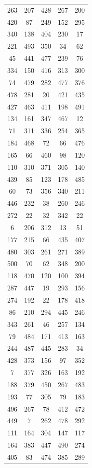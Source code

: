 \documentclass[a4paper,12pt]{article}
\begin{document}
\begin{longtable}{|c|c|c|c|c|}
263 & 207 & 428 & 267 & 200 \\
420 & 87 & 249 & 152 & 295 \\
340 & 138 & 404 & 230 & 17 \\
221 & 493 & 350 & 34 & 62 \\
45 & 441 & 477 & 239 & 76 \\
334 & 150 & 416 & 313 & 300 \\
74 & 479 & 282 & 477 & 376 \\
478 & 281 & 20 & 421 & 435 \\
427 & 463 & 411 & 198 & 491 \\
134 & 161 & 347 & 467 & 12 \\
71 & 311 & 336 & 254 & 365 \\
184 & 468 & 72 & 66 & 476 \\
165 & 66 & 460 & 98 & 120 \\
110 & 310 & 371 & 305 & 140 \\
439 & 85 & 123 & 178 & 485 \\
60 & 73 & 356 & 340 & 211 \\
446 & 232 & 38 & 260 & 246 \\
272 & 22 & 32 & 342 & 22 \\
6 & 206 & 312 & 13 & 51 \\
177 & 215 & 66 & 435 & 407 \\
480 & 303 & 261 & 271 & 389 \\
500 & 70 & 62 & 348 & 200 \\
118 & 470 & 120 & 100 & 394 \\
287 & 447 & 19 & 293 & 156 \\
274 & 192 & 22 & 178 & 418 \\
86 & 210 & 294 & 445 & 246 \\
343 & 261 & 46 & 257 & 134 \\
79 & 484 & 171 & 413 & 163 \\
244 & 487 & 445 & 283 & 34 \\
428 & 373 & 156 & 97 & 352 \\
7 & 377 & 326 & 163 & 192 \\
188 & 379 & 450 & 267 & 483 \\
193 & 77 & 305 & 79 & 183 \\
496 & 267 & 78 & 412 & 472 \\
449 & 7 & 262 & 478 & 292 \\
111 & 164 & 304 & 147 & 117 \\
164 & 383 & 447 & 490 & 274 \\
405 & 83 & 474 & 385 & 289 \\

\end{longtable}
\end{document}
